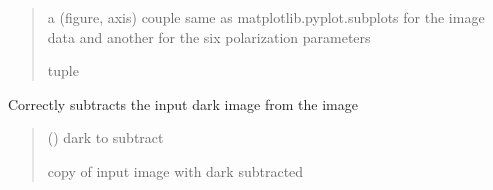 \documentclass[letterpaper,10pt,english]{sphinxmanual}
\begin{document}
\begin{fulllineitems}
\begin{fulllineitems}
\begin{quote}
\begin{description}
\sphinxAtStartPar
a (figure, axis) couple same as matplotlib.pyplot.subplots for the image data and another for the six polarization parameters

\sphinxAtStartPar
tuple

\end{description}\end{quote}

\end{fulllineitems}


\begin{fulllineitems}
\label{\detokenize{micropolarray:micropolarray.micropol_image.MicropolImage.single_pol_subimages}}
\pysigstartsignatures
{}
\pysigstopsignatures
\end{fulllineitems}


\begin{fulllineitems}
\label{\detokenize{micropolarray:micropolarray.micropol_image.MicropolImage.subtract_dark}}
\pysigstartsignatures
{}
\pysigstopsignatures
\sphinxAtStartPar
Correctly subtracts the input dark image from the image
\begin{quote}\begin{description}
\sphinxAtStartPar
{} ({\hyperref[\detokenize{micropolarray:micropolarray.micropol_image.MicropolImage}]{}}) \textendash{} dark to subtract

\sphinxAtStartPar
copy of input image with dark subtracted

\sphinxAtStartPar
{\hyperref[\detokenize{micropolarray:micropolarray.micropol_image.MicropolImage}]{}}

\end{description}\end{quote}

\end{fulllineitems}


\end{fulllineitems}
\end{document}
